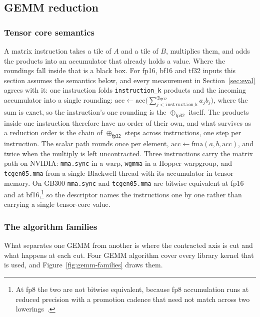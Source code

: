 \documentclass[sigplan,nonacm]{acmart}
\newcommand{\dt}[1]{\mathsf{#1}}
\newcommand{\fpadd}[1]{\mathbin{\oplus_{\dt{#1}}}}
\begin{document}
\subsection{GEMM reduction}
\label{sec:theory-gemm}

\subsubsection{Tensor core semantics}
\label{sec:theory-tensorcore}

A matrix instruction takes a tile of $A$ and a tile of $B$, multiplies them, and
adds the products into an accumulator that already holds a value. Where the
roundings fall inside that is a black box. For fp16, bf16 and tf32 inputs this
section assumes the semantics below, and every measurement in
Section~\ref{sec:eval} agrees with it: one instruction folds \texttt{instruction\_k} products and the incoming accumulator
into a single rounding:
$\mathrm{acc} \leftarrow \mathrm{acc} \big( \sum^{\fpadd{fp32}}_{j <
\mathtt{instruction\_k}} a_j b_j \big)$,
where the sum is exact, so the instruction's one rounding is the
$\fpadd{fp32}$ itself. The products inside one instruction therefore have
no order of their own, and what survives as a reduction order is the chain of
$\fpadd{fp32}$ steps across instructions, one step per instruction. The scalar
path rounds once per element, $\mathrm{acc} \leftarrow \mathrm{fma}(a,b,\mathrm{acc})$,
and twice when the multiply is left uncontracted. Three instructions carry the
matrix path on NVIDIA: \texttt{mma.sync} in a warp, \texttt{wgmma} in a Hopper
warpgroup, and \texttt{tcgen05.mma} from a single Blackwell thread with its
accumulator in tensor memory. On GB300 \texttt{mma.sync} and
\texttt{tcgen05.mma} are bitwise equivalent at fp16 and at bf16,\footnote{At fp8 the two are not bitwise equivalent, because fp8 accumulation runs at reduced precision with a promotion cadence that need not match across two lowerings~\cite{mmasim, tcmodels}.} so the descriptor names the instructions one by
one rather than carrying a single tensor-core value.

\subsubsection{The algorithm families}
\label{sec:theory-families}


What separates one GEMM from another is where
the contracted axis is cut and what happens at each cut. 
Four GEMM algorithm cover every
library kernel that is used, and Figure~\ref{fig:gemm-families} draws them.
\end{document}
